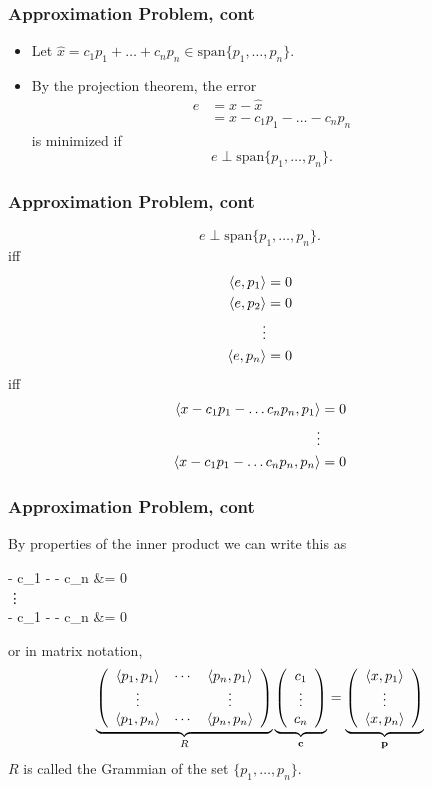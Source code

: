 \documentclass{beamer}
\begin{document}
\begin{frame}\frametitle{Approximation Problem, cont}
	\begin{itemize}
	
	\item Let $\hat{x} = c_1 p_1 + \ldots + c_n p_n \in \text{span}\{p_1, \dots, p_n\}$.
	\item By the projection theorem, the error
	\begin{align*}
		e &= x - \hat x \\
		  &= x - c_1 p_1 - \ldots - c_n p_n
	\end{align*}
	is minimized if 
	\[
	e \perp \text{span}\{ p_1, \ldots, p_n\}.
	\]
	\end{itemize}
\end{frame}

\begin{frame}\frametitle{Approximation Problem, cont}
	\[
	e \perp \text{span}\{ p_1, \ldots, p_n\}.
	\]
	iff
	\begin{align*}
		\left< e, p_1\right> &= 0\\
		\left< e, p_2\right> &= 0\\
		\vdots\\
		\left< e, p_n \right> &= 0	
	\end{align*}
	iff
	\begin{align*}
		\left< x - c_1p_1 - \ldots c_np_n, p_1 \right> &= 0\\
		\vdots\\
		\left< x - c_1p_1 - \ldots c_np_n, p_n \right> &= 0
	\end{align*}
\end{frame}

\begin{frame}\frametitle{Approximation Problem, cont}
	By properties of the inner product we can write this as
	\begin{flalign*}
	 - c_1  - \cdots - c_n  &= 0\\
	\vdots\\
	 - c_1  - \cdots - c_n  &= 0
	\end{flalign*}
	or in matrix notation,
	\[
	\underbrace{
		\left(
		\begin{array}{ccc}
		\left< p_1, p_1\right> & \cdots & \left< p_n, p_1\right>\\
		\vdots & & \vdots \\
		\left< p_1, p_n\right> & \cdots & \left< p_n, p_n\right>
		\end{array}
		\right)
	}_{R}
	\underbrace{\left(
	\begin{array}{c}
	c_1\\
	\vdots\\
	c_n
	\end{array}
	\right)}_{\mathbf{c}}
	= 
	\underbrace{\left(
	\begin{array}{c}
	\left< x, p_1\right>\\
	\vdots\\
	\left< x, p_n\right>
	\end{array}
	\right)}_{\mathbf{p}}
	\]
	$R$ is called the Grammian of the set $\{p_1,\ldots,p_n\}$.
\end{frame}
\end{document}

